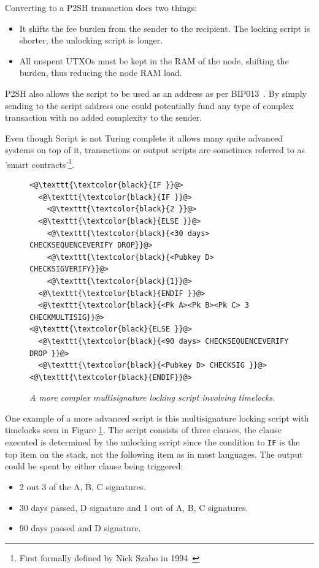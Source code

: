 Converting to a P2SH transaction does two things:

\begin{itemize}

	\item It shifts the fee burden from the sender to the recipient. The locking script is shorter, the unlocking script is longer.
	
	\item All unspent UTXOs must be kept in the RAM of the \gls{node}, shifting the burden, thus reducing the \gls{node} RAM load.
	
\end{itemize}

P2SH also allows the script to be used as an address as per BIP013~\cite{bip:0013:p2shaddr}. By simply sending to the script address one could potentially fund any type of complex transaction with no added complexity to the sender.

Even though Script is not Turing complete it allows many quite advanced systems on top of it, transactions or output scripts are sometimes referred to as 'smart contracts'\footnote{First formally defined by Nick Szabo in 1994~\cite{szabo:smart:contracts}}.

\begin{figure}[hbt!]
	
	\begin{lstlisting}	
<@\texttt{\textcolor{black}{IF }}@>
  <@\texttt{\textcolor{black}{IF }}@>
    <@\texttt{\textcolor{black}{2 }}@>
  <@\texttt{\textcolor{black}{ELSE }}@>
    <@\texttt{\textcolor{black}{<30 days> CHECKSEQUENCEVERIFY DROP}}@>
    <@\texttt{\textcolor{black}{<Pubkey D> CHECKSIGVERIFY}}@>
    <@\texttt{\textcolor{black}{1}}@>
  <@\texttt{\textcolor{black}{ENDIF }}@>
  <@\texttt{\textcolor{black}{<Pk A><Pk B><Pk C> 3 CHECKMULTISIG}}@>
<@\texttt{\textcolor{black}{ELSE }}@>
  <@\texttt{\textcolor{black}{<90 days> CHECKSEQUENCEVERIFY DROP }}@>
  <@\texttt{\textcolor{black}{<Pubkey D> CHECKSIG }}@>
<@\texttt{\textcolor{black}{ENDIF}}@>

	\end{lstlisting}
	
	\caption{\textit{ A more complex multisignature locking script involving timelocks.
	}}
	\label{fig:aantop:multi}
\end{figure}

One example of a more advanced script is this multisignature locking script with timelocks seen in Figure \ref{fig:aantop:multi}. The script consists of three clauses, the clause executed is determined by the unlocking script since the condition to \texttt{IF} is the top item on the stack, not the following item as in most languages. The output could be spent by either clause being triggered:
\begin{itemize}
	\item 2 out 3 of the A, B, C signatures.
	\item 30 days passed, D signature and 1 out of A, B, C signatures.
	\item 90 days passed and D signature.
\end{itemize}

